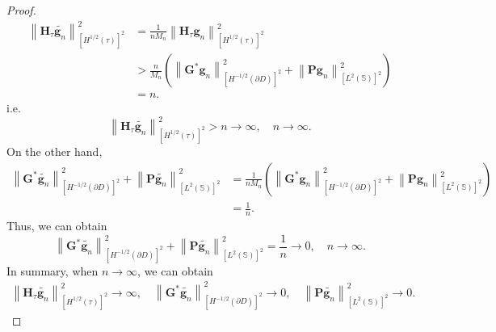 \documentclass[11pt,reqno,twoside]{amsart}
\theoremstyle{definition}
\theoremstyle{remark}
\numberwithin{equation}{section}
\begin{document}
\begin{proof}
\begin{equation}\begin{aligned}
\left\| \mathbf H_{\tau} \tilde{\mathbf g_n} \right\|^2_{\left[H^{1/2}\left(\tau \right) \right] ^2 }
&= \frac{1}{n M_n} \left\| \mathbf H_{\tau} \mathbf g_n \right\|^2_{\left[H^{1/2}\left(\tau \right) \right] ^2 } \\
&>\frac{n}{M_n} \left( \left\|  \mathbf G^* \mathbf g_n \right\|^2_{\left[H^{-1/2}\left(\partial D \right) \right] ^2}+\left\|  \mathbf P \mathbf g_n \right\|^2_{\left[L^{2}\left(\mathbb S \right) \right] ^2} \right) \\
&= n.
\end{aligned}\end{equation}
i.e. 
$$
\left\| \mathbf H_{\tau} \tilde{\mathbf g_n} \right\|^2_{\left[H^{1/2}\left(\tau \right) \right] ^2 } > n \to \infty,\quad   n \to \infty .
$$
On the other hand, 
\begin{equation}\begin{aligned}
		\left\| \mathbf G^* \tilde{\mathbf g_n} \right\|^2_{\left[H^{-1/2}\left(\partial D \right) \right] ^2}+\left\| \mathbf P \tilde{\mathbf g_n} \right\|^2_{\left[L^{2}\left(\mathbb S \right) \right] ^2}
		&= \frac{1}{n M_n} \left(\left\| \mathbf G^* \mathbf g_n \right\|^2_{\left[H^{-1/2}\left(\partial D \right) \right] ^2}+\left\| \mathbf P \mathbf g_n \right\|^2_{\left[L^{2}\left(\mathbb S \right) \right] ^2} \right) \\
		&= \frac{1}{n}.
\end{aligned}\end{equation}
Thus, we can obtain
$$
\left\| \mathbf G^* \tilde{\mathbf g_n} \right\|^2_{\left[H^{-1/2}\left(\partial D \right) \right] ^2}+\left\| \mathbf P \tilde{\mathbf g_n} \right\|^2_{\left[L^{2}\left(\mathbb S \right) \right] ^2}= \frac{1}{n} \to 0, \quad n \to \infty .
$$
In summary, when $n \to \infty $, we can obtain
\begin{equation}\begin{aligned}\label{eq:HGPasymptotic}
  \left\| \mathbf H_{\tau} \tilde{\mathbf g_n} \right\|^2_{\left[H^{1/2}\left(\tau \right) \right] ^2 } \to \infty ,\quad \left\| \mathbf G^* \tilde{\mathbf g_n} \right\|^2_{\left[H^{-1/2}\left(\partial D \right) \right] ^2} \to 0,\quad \left\| \mathbf P \tilde{\mathbf g_n} \right\|^2_{\left[L^{2}\left(\mathbb S \right) \right] ^2} \to 0.
 \end{aligned}\end{equation}


\end{proof}
\end{document}
